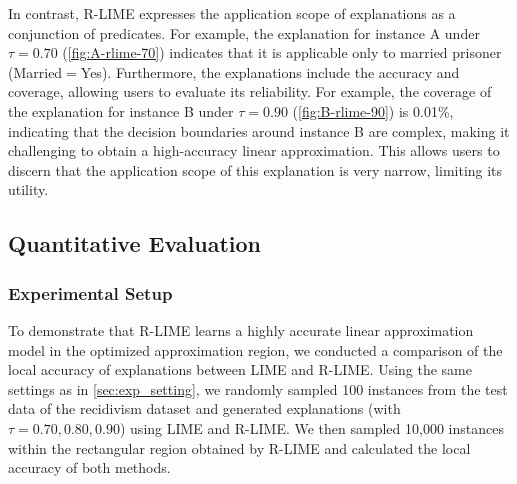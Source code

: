 \documentclass[11pt]{article}
\begin{document}
In contrast, R-LIME expresses the application scope of explanations
as a conjunction of predicates.
For example, the explanation for instance A
under $\tau=0.70$ (\cref{fig:A-rlime-70}) indicates that it is applicable
only to married prisoner (Married$=$Yes).
Furthermore, the explanations include the accuracy and coverage,
allowing users to evaluate its reliability.
For example, the coverage of the explanation for instance B under $\tau=0.90$
(\cref{fig:B-rlime-90}) is 0.01\%,
indicating that the decision boundaries around instance B are complex,
making it challenging to obtain a high-accuracy linear approximation.
This allows users to discern that the application scope of this explanation is
very narrow, limiting its utility.

\subsection{Quantitative Evaluation}\label{sec:exp2}
\subsubsection{Experimental Setup}
To demonstrate that R-LIME learns a highly accurate linear approximation model
in the optimized approximation region,
we conducted a comparison of the local accuracy of explanations
between LIME and R-LIME\@.
Using the same settings as in \cref{sec:exp_setting},
we randomly sampled 100 instances from the test data of the recidivism dataset
and generated explanations (with $\tau=0.70,0.80,0.90$) using LIME and R-LIME\@.
We then sampled 10,000 instances within the rectangular region
obtained by R-LIME and calculated the local accuracy of both methods.
\end{document}
